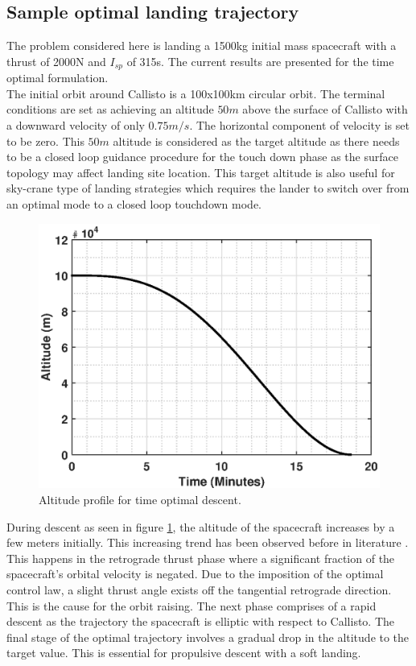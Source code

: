 \subsection{Sample optimal landing trajectory}
The problem considered here is landing a 1500kg initial mass spacecraft with a thrust of 2000N and $I_{sp}$ of 315s. The current results are presented for the time optimal formulation.\\
The initial orbit around Callisto is a 100x100km circular orbit. The terminal conditions are set as achieving an altitude $50m$ above the surface of Callisto with a downward velocity of only $0.75m/s$. The horizontal component of velocity is set to be zero. This $50m$ altitude is considered as the target altitude as there needs to be a closed loop guidance procedure for the touch down phase as the surface topology may affect landing site location. This target altitude is also useful for sky-crane type of landing strategies which requires the lander to switch over from an optimal mode to a closed loop touchdown mode.\\
\begin{figure}[ht!]
	\centering\includegraphics[width=0.90\linewidth]{Altitude.eps}
	\caption{Altitude profile for time optimal descent.}
	\label{altitude}
\end{figure}
During descent as seen in figure \ref{altitude}, the altitude of the spacecraft increases by a few meters initially. This increasing trend has been observed before in literature \citep{ramanan2005analysis}. This happens in the retrograde thrust phase where a significant fraction of the spacecraft's orbital velocity is negated. Due to the imposition of the optimal control law, a slight thrust angle exists off the tangential retrograde direction. This is the cause for the orbit raising. The next phase comprises of a rapid descent as the trajectory the spacecraft is elliptic with respect to Callisto. The final stage of the optimal trajectory involves a gradual drop in the altitude to the target value. This is essential for propulsive descent with a soft landing.\\
